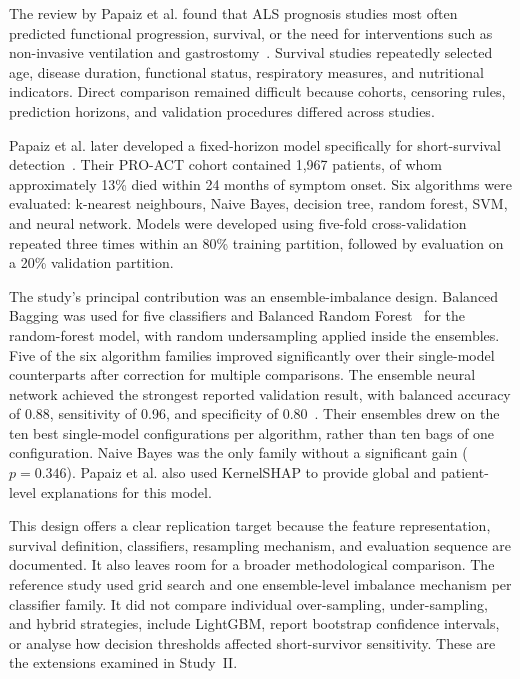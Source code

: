 The review by Papaiz et al. found that ALS prognosis studies most often predicted functional progression, survival, or the need for interventions such as non-invasive ventilation and gastrostomy~\cite{Papaiz2022}. Survival studies repeatedly selected age, disease duration, functional status, respiratory measures, and nutritional indicators. Direct comparison remained difficult because cohorts, censoring rules, prediction horizons, and validation procedures differed across studies.

Papaiz et al. later developed a fixed-horizon model specifically for short-survival detection~\cite{Papaiz2024}. Their \gls{PRO-ACT} cohort contained 1,967 patients, of whom approximately 13\% died within 24 months of symptom onset. Six algorithms were evaluated: k-nearest neighbours, Naive Bayes, decision tree, random forest, \gls{SVM}, and neural network. Models were developed using five-fold cross-validation repeated three times within an 80\% training partition, followed by evaluation on a 20\% validation partition.

The study's principal contribution was an ensemble-imbalance design. Balanced Bagging was used for five classifiers and Balanced Random Forest~\cite{chen2004balancedrf} for the random-forest model, with random undersampling applied inside the ensembles. Five of the six algorithm families improved significantly over their single-model counterparts after correction for multiple comparisons. The ensemble neural network achieved the strongest reported validation result, with balanced accuracy of 0.88, sensitivity of 0.96, and specificity of 0.80~\cite{Papaiz2024}. Their ensembles drew on the ten best single-model configurations per algorithm, rather than ten bags of one configuration. Naive Bayes was the only family without a significant gain ($p=0.346$). Papaiz et al. also used KernelSHAP to provide global and patient-level explanations for this model.

This design offers a clear replication target because the feature representation, survival definition, classifiers, resampling mechanism, and evaluation sequence are documented. It also leaves room for a broader methodological comparison. The reference study used grid search and one ensemble-level imbalance mechanism per classifier family. It did not compare individual over-sampling, under-sampling, and hybrid strategies, include LightGBM, report bootstrap confidence intervals, or analyse how decision thresholds affected short-survivor sensitivity. These are the extensions examined in Study~II.

